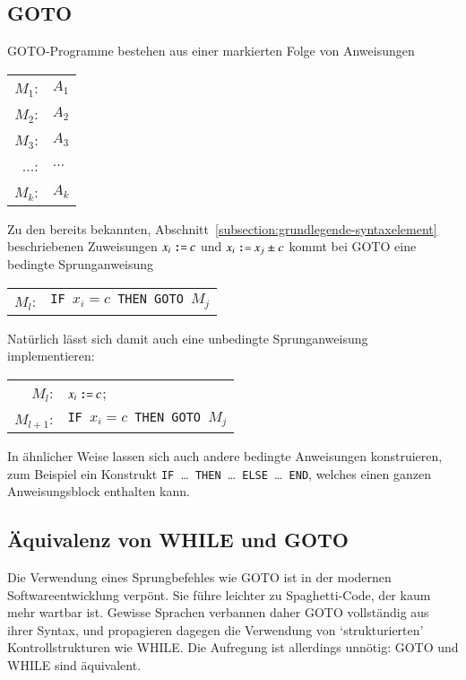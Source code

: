 \subsection{GOTO}
%
GOTO-Programme bestehen aus einer markierten Folge von Anweisungen
\begin{center}
\begin{tabular}{rl}
$M_1$:&$A_1$\\
$M_2$:&$A_2$\\
$M_3$:&$A_3$\\
$\dots$:&$\dots$\\
$M_k$:&$A_k$
\end{tabular}
\end{center}
Zu den bereits bekannten,
Abschnitt~\ref{subsection:grundlegende-syntaxelement} beschriebenen
Zuweisungen
$x_i \mathbin{\texttt{:=}} c$ 
und
$x_i \mathbin{\texttt{:=}} x_j \pm c$ 
kommt bei GOTO eine bedingte Sprunganweisung
\begin{center}
\begin{tabular}{rl}
$M_l$:&{\tt IF\ }$x_i=c${\tt\ THEN GOTO\ }$M_j$
\end{tabular}
\end{center}
Natürlich lässt sich damit auch eine unbedingte Sprunganweisung
implementieren:
\begin{center}
\begin{tabular}{rl}
$M_l$:&$x_i \mathbin{\texttt{:=}} c$;\\
$M_{l+1}$:&{\tt IF\ }$x_i=c${\tt\ THEN GOTO\ }$M_j$
\end{tabular}
\end{center}
In ähnlicher Weise lassen sich auch andere bedingte Anweisungen
konstruieren, zum Beispiel ein
Konstrukt {\tt IF }\dots{\tt\ THEN }\dots{\tt\ ELSE }\dots{\tt\ END}, welches
einen ganzen Anweisungsblock enthalten kann.

\subsection{Äquivalenz von WHILE und GOTO}
Die Verwendung eines Sprungbefehles wie GOTO ist in der modernen
Softwareentwicklung verpönt.
Sie führe leichter zu Spaghetti-Code, der kaum mehr wartbar ist.
Gewisse Sprachen verbannen daher
GOTO vollständig aus ihrer Syntax, und propagieren dagegen
die Verwendung von `strukturierten' Kontrollstrukturen wie
WHILE.
Die Aufregung ist allerdings unnötig: GOTO und WHILE sind äquivalent.


